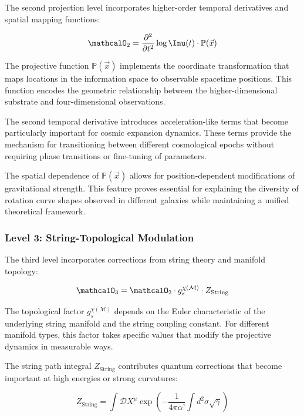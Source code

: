 The second projection level incorporates higher-order temporal derivatives and spatial mapping functions:

\begin{equation}
\mathcalO_2 = \frac{\partial^2}{\partial t^2} \log \Inu(t) \cdot \mathbb{P}(\vec{x})
\label{eq:level2-projection}
\end{equation}

The projective function $\mathbb{P}(\vec{x})$ implements the coordinate transformation that maps locations in the information space to observable spacetime positions. This function encodes the geometric relationship between the higher-dimensional substrate and four-dimensional observations.

The second temporal derivative introduces acceleration-like terms that become particularly important for cosmic expansion dynamics. These terms provide the mechanism for transitioning between different cosmological epochs without requiring phase transitions or fine-tuning of parameters.

The spatial dependence of $\mathbb{P}(\vec{x})$ allows for position-dependent modifications of gravitational strength. This feature proves essential for explaining the diversity of rotation curve shapes observed in different galaxies while maintaining a unified theoretical framework.

\subsubsection{Level 3: String-Topological Modulation}
\label{subsubsec:level3-string}

The third level incorporates corrections from string theory and manifold topology:

\begin{equation}
\mathcalO_3 = \mathcalO_2 \cdot g_s^{\chi(\mathcal{M})} \cdot Z_{\text{String}}
\label{eq:level3-projection}
\end{equation}

The topological factor $g_s^{\chi(\mathcal{M})}$ depends on the Euler characteristic of the underlying string manifold and the string coupling constant. For different manifold types, this factor takes specific values that modify the projective dynamics in measurable ways.

The string path integral $Z_{\text{String}}$ contributes quantum corrections that become important at high energies or strong curvatures:

\begin{equation}
Z_{\text{String}} = \int \mathcal{D}X^\mu \exp\left(-\frac{1}{4\pi\alpha’} \int d^2\sigma \sqrt{\gamma}\right)
\label{eq:string-path-integral}
\end{equation}

